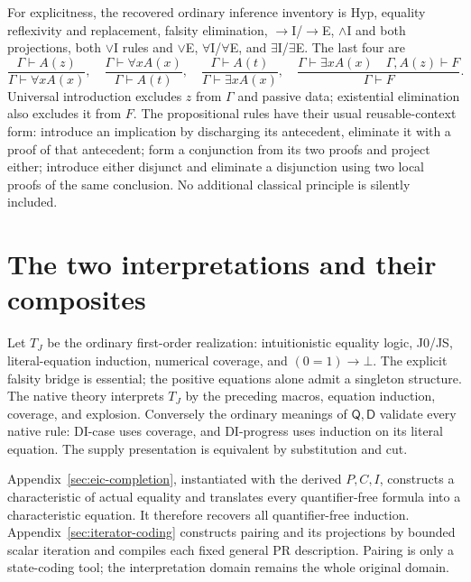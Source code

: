 \documentclass[11pt,letterpaper]{article}
\theoremstyle{definition}\newtheorem{definition}[theorem]{Definition}
\theoremstyle{remark}\newtheorem{remark}[theorem]{Remark}
\newcommand{\D}{\mathsf D}
\newcommand{\Q}{\mathsf Q}
\begin{document}
For explicitness, the recovered ordinary inference inventory is Hyp,
equality reflexivity and replacement, falsity elimination,
$\to$I/$\to$E, $\wedge$I and both projections, both $\vee$I rules
and $\vee$E, $\forall$I/$\forall$E, and $\exists$I/$\exists$E.
The last four are
\[
 \frac{\Gamma\vdash A(z)}{\Gamma\vdash\forall xA(x)},\quad
 \frac{\Gamma\vdash\forall xA(x)}{\Gamma\vdash A(t)},\quad
 \frac{\Gamma\vdash A(t)}{\Gamma\vdash\exists xA(x)},\quad
 \frac{\Gamma\vdash\exists xA(x)\quad\Gamma,A(z)\vdash F}
      {\Gamma\vdash F}.
\]
Universal introduction excludes $z$ from $\Gamma$ and passive data;
existential elimination also excludes it from $F$. The propositional
rules have their usual reusable-context form: introduce an implication
by discharging its antecedent, eliminate it with a proof of that
antecedent; form a conjunction from its two proofs and project either;
introduce either disjunct and eliminate a disjunction using two local
proofs of the same conclusion. No additional classical principle is
silently included.

\section{The two interpretations and their composites}
\label{sec:interpretations}
Let $T_J$ be the ordinary first-order realization: intuitionistic equality
logic, J0/JS, literal-equation induction, numerical coverage, and
$(0=1)\to\bot$. The explicit falsity bridge is essential; the positive
equations alone admit a singleton structure. The native theory interprets
$T_J$ by the preceding macros, equation induction, coverage, and explosion.
Conversely the ordinary meanings of $\Q,\D$ validate every native rule:
DI-case uses coverage, and DI-progress uses induction on its literal
equation. The supply presentation is equivalent by substitution and cut.

Appendix~\ref{sec:eic-completion}, instantiated with the derived $P,C,I$,
constructs a characteristic of actual equality and translates every
quantifier-free formula into a characteristic equation. It therefore
recovers all quantifier-free induction. Appendix~\ref{sec:iterator-coding}
constructs pairing and its projections by bounded scalar iteration and
compiles each fixed general PR description. Pairing is only a state-coding
tool; the interpretation domain remains the whole original domain.
\end{document}
